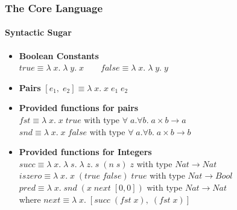 \documentclass[xcolor=table]{beamer}
\begin{document}
\begin{frame}
\frametitle{The Core Language}
\framesubtitle{Syntactic Sugar}
\begin{block}{}
\begin{itemize}
\item \textbf{Boolean Constants} \\
$true \equiv \lambda \; x. \; \lambda \; y.\;  x \;\;\;\;\;\;$ 
$false \equiv \lambda \; x. \; \lambda \; y.\;  y$ \\
\item \textbf{Pairs} 
$[e_1, \; e_2] \equiv \lambda \;x.\; x \; e_1 \; e_2$ \\
\item \textbf{Provided functions for pairs} \\
$fst \equiv \lambda \;x.\; x \; true$ with type $\forall \;a. \forall b. \; a \times b \rightarrow a$\\
$snd \equiv \lambda \;x.\; x \; false$ with type $\forall \;a. \forall b. \; a \times b \rightarrow b$\\
\item \textbf{Provided functions for Integers} \\
$succ \equiv \lambda \; x. \; \lambda \; s. \; \lambda \; z. \;s \; (n \; s) \; z $ with type $Nat \rightarrow Nat$\\
$iszero \equiv \lambda \; x.\; x \; (true \; false) \; true $ with type $Nat \rightarrow Bool$ \\
$pred \equiv \lambda \; x.\; snd \; (x \; next \; [0,0] )$ with type $Nat \rightarrow Nat$ \\
where $next \equiv \lambda \; x. \; [succ \; (fst\;x), \; (fst\;x)]$
\end{itemize}
\end{block}
\end{frame}
\end{document}
